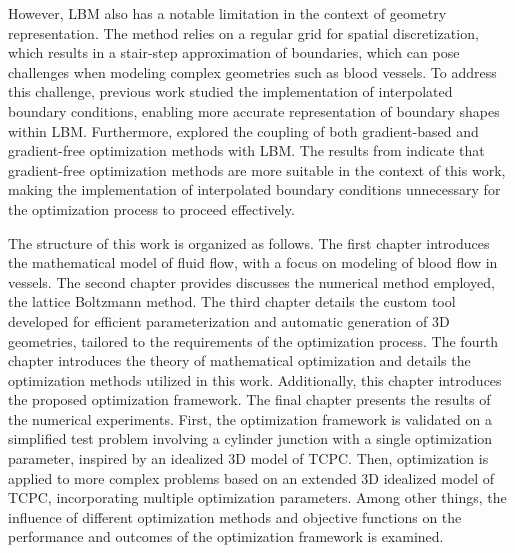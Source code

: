 However, LBM also has a notable limitation in the context of geometry representation. The method relies on a regular grid for spatial discretization, which results in a stair-step approximation of boundaries, which can pose challenges when modeling complex geometries such as blood vessels. To address this challenge, previous work \cite{buresBP, buresVU} studied the implementation of interpolated boundary conditions, enabling more accurate representation of boundary shapes within LBM. Furthermore, \cite{buresVU} explored the coupling of both gradient-based and gradient-free optimization methods with LBM. The results from \cite{buresVU} indicate that gradient-free optimization methods are more suitable in the context of this work, making the implementation of interpolated boundary conditions unnecessary for the optimization process to proceed effectively.



The structure of this work is organized as follows. The first chapter introduces the mathematical model of fluid flow, with a focus on modeling of blood flow in vessels. The second chapter provides discusses the numerical method employed, the lattice Boltzmann method. The third chapter details the custom tool developed for efficient parameterization and automatic generation of 3D geometries, tailored to the requirements of the optimization process. The fourth chapter introduces the theory of mathematical optimization and details the optimization methods utilized in this work. Additionally, this chapter introduces the proposed optimization framework. The final chapter presents the results of the numerical experiments. First, the optimization framework is validated on a simplified test problem involving a cylinder junction with a single optimization parameter, inspired by an idealized 3D model of TCPC. Then, optimization is applied to more complex problems based on an extended 3D idealized model of TCPC, incorporating multiple optimization parameters. Among other things, the influence of different optimization methods and objective functions on the performance and outcomes of the optimization framework is examined.


